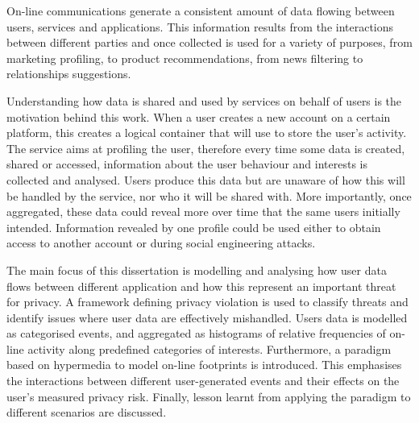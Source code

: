 On-line communications generate a consistent amount of data flowing between users, services and applications. This information results from the interactions between different parties and once collected is used for a variety of purposes, from marketing profiling, to product recommendations, from news filtering to relationships suggestions. 

Understanding how data is shared and used by services on behalf of users is the motivation behind this work.  When a user creates a new account on a certain platform, this creates a logical container that will use to store the user's activity. The service aims at profiling the user, therefore every time some data is created, shared or accessed, information about the user behaviour and interests is collected and analysed. Users produce this data but are unaware of how this will be handled by the service, nor who it will be shared with. More importantly, once aggregated, these data could reveal more over time that the same users initially intended. Information revealed by one profile could be used either to obtain access to another account or during social engineering attacks.

The main focus of this dissertation is modelling and analysing how user data flows between different application and how this represent an important threat for privacy. A framework defining privacy violation is used to classify threats and identify issues where user data are effectively mishandled. Users data is modelled as categorised events, and aggregated as histograms of relative frequencies of on-line activity along predefined categories of interests. Furthermore, a paradigm based on hypermedia to model on-line footprints is introduced. This emphasises the interactions between different user-generated events and their effects on the user’s measured privacy risk. Finally, lesson learnt from applying the paradigm to different scenarios are discussed.